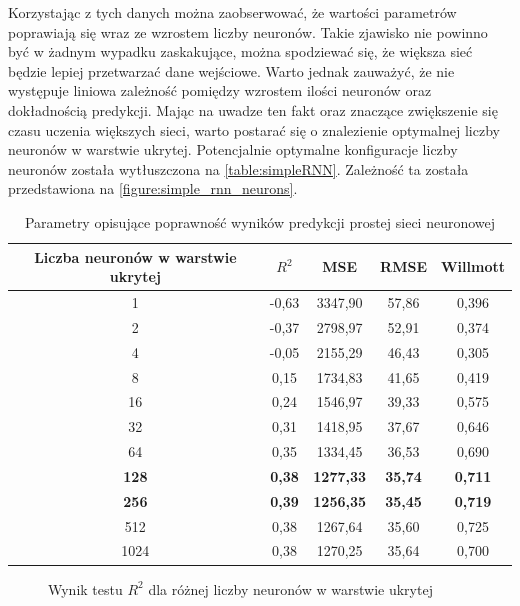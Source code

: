 \documentclass[10pt,a4paper]{article}
\begin{document}
Korzystając z tych danych można zaobserwować, że wartości parametrów poprawiają się wraz ze wzrostem liczby neuronów. Takie zjawisko nie powinno być w żadnym wypadku zaskakujące, można spodziewać się, że większa sieć będzie lepiej przetwarzać dane wejściowe. Warto jednak zauważyć, że nie występuje liniowa zależność pomiędzy wzrostem ilości neuronów oraz dokładnością predykcji. Mając na uwadze ten fakt oraz znaczące zwiększenie się czasu uczenia większych sieci, warto postarać się o znalezienie optymalnej liczby neuronów w warstwie ukrytej. Potencjalnie optymalne konfiguracje liczby neuronów została wytłuszczona na \autoref{table:simpleRNN}. Zależność ta została przedstawiona na \autoref{figure:simple_rnn_neurons}.

\begin{table}[h!]
	\centering
	\begin{tabular}{|c|c|c|c|c|}
		\hline
		Liczba neuronów w warstwie ukrytej & $R^2$ & MSE & RMSE & Willmott \\
		\hline
		1    & -0,63 & 3347,90 & 57,86 & 0,396 \\
		2    & -0,37 & 2798,97 & 52,91 & 0,374 \\
		4    & -0,05 & 2155,29 & 46,43 & 0,305 \\
		8    & 0,15  & 1734,83 & 41,65 & 0,419 \\
		16   & 0,24  & 1546,97 & 39,33 & 0,575 \\
		32   & 0,31  & 1418,95 & 37,67 & 0,646 \\
		64   & 0,35  & 1334,45 & 36,53 & 0,690 \\
		\textbf{128}  & \textbf{0,38}  & \textbf{1277,33} & \textbf{35,74} & \textbf{0,711} \\
		\textbf{256}  & \textbf{0,39}  & \textbf{1256,35} & \textbf{35,45} & \textbf{0,719} \\
		512  & 0,38  & 1267,64 & 35,60 & 0,725 \\
		1024 & 0,38  & 1270,25 & 35,64 & 0,700 \\
		\hline
	\end{tabular}
	\caption{Parametry opisujące poprawność wyników predykcji prostej sieci neuronowej}
	\label{table:simpleRNN}
\end{table}
\begin{figure}[!ht]
	\centering
	\caption{Wynik testu $R^2$ dla różnej liczby neuronów w warstwie ukrytej}
	\label{figure:simple_rnn_neurons}
\end{figure}
\end{document}
